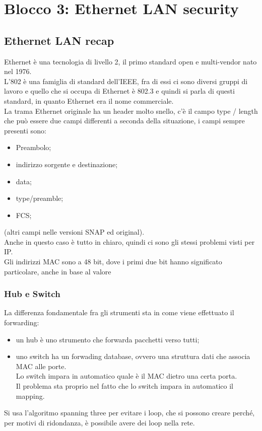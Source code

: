 \documentclass[12pt, oneside]{extbook} %
\begin{document}
\chapter{Blocco 3: Ethernet LAN security}
\section{Ethernet LAN recap}
Ethernet è una tecnologia di livello 2, il primo standard open e multi-vendor nato nel 1976.
\\L'802 è una famiglia di standard dell'IEEE, fra di essi ci sono diversi gruppi di lavoro e quello che si occupa di Ethernet è 802.3 e quindi si parla di questi standard, in quanto Ethernet era il nome commerciale.
\\La trama Ethernet originale ha un header molto snello, c'è il campo type / length che può essere due campi differenti a seconda della situazione, i campi sempre presenti sono:
\begin{itemize}
    \item Preambolo;
    \item indirizzo sorgente e destinazione;
    \item data;
    \item type/preamble;
    \item FCS;
\end{itemize}
(altri campi nelle versioni SNAP ed original).
\\Anche in questo caso è tutto in chiaro, quindi ci sono gli stessi problemi visti per IP.
\\Gli indirizzi MAC sono a 48 bit, dove i primi due bit hanno significato particolare, anche in base al valore

\subsection{Hub e Switch}
La differenza fondamentale fra gli strumenti sta in come viene effettuato il forwarding:
\begin{itemize}
    \item un hub è uno strumento che forwarda pacchetti verso tutti; 
    \item uno switch ha un forwading database, ovvero una struttura dati che associa MAC alle porte.
    \\Lo switch impara in automatico quale è il MAC dietro una certa porta.
    \\Il problema sta proprio nel fatto che lo switch impara in automatico il mapping.
\end{itemize}
Si usa l'algoritmo spanning three per evitare i loop, che si possono creare perché, per motivi di ridondanza, è possibile avere dei loop nella rete.
\end{document}
